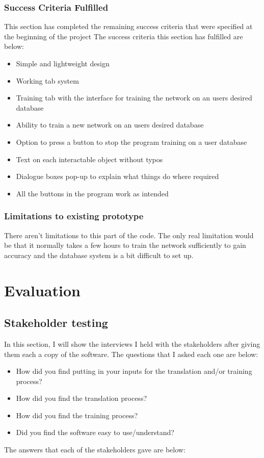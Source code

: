 \documentclass{report}
\begin{document}
\subsection{Success Criteria Fulfilled}
This section has completed the remaining success criteria that were specified at the beginning of the project
\newline
The success criteria this section has fulfilled are below:
\begin{itemize}
    \item Simple and lightweight design
    \item Working tab system
    \item Training tab with the interface for training the network on an users desired database
    \item Ability to train a new network on an users desired database
    \item Option to press a button to stop the program training on a user database
    \item Text on each interactable object without  typos
    \item Dialogue boxes pop-up to explain what things do where required
    \item All the buttons in the program work as intended
\end{itemize}
\subsection{Limitations to existing prototype}
There aren't limitations to this part of the code. The only real limitation would be that it normally takes a few hours to train the network sufficiently to gain accuracy and the database system is a bit difficult to set up. 
\newpage
\chapter{Evaluation}
\section{Stakeholder testing}
In this section, I will show the interviews I held with the stakeholders after giving them each a copy of the software. The questions that I asked each one are below:
\begin{itemize}
    \item How did you find putting in your inputs for the translation and/or training process?
    \item How did you find the translation process?
    \item How did you find the training process?
    \item Did you find the software easy to use/understand?
\end{itemize}
The answers that each of the stakeholders gave are below:
\end{document}
